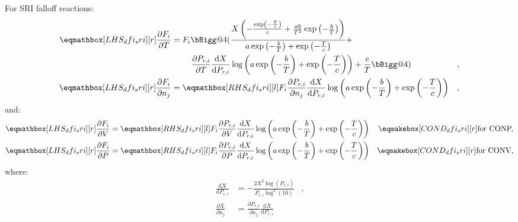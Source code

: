 \documentclass[12pt]{article}
\makeatletter
\newcommand{\conp}{CONP}
\newcommand{\conv}{CONV}
\newcommand{\dconp}{\ifmmode\text{for \conp,}\else for \conp,\fi}
\newcommand{\dconv}{\ifmmode\text{for \conv,}\else for \conv.\fi}
\newcommand{\vast}{\bBigg@{4}}
\makeatother
\begin{document}
For SRI falloff reactions:
\begin{align}
 \lhs{dfi_sri}{\frac{\partial F_{i} }{\partial T }} &= F_{i} \vast(\frac{X \left(- \frac{\operatorname{exp}\left({- \frac{T}{c}}\right)}{c} + \frac{a b}{T^{2}} \operatorname{exp}\left({- \frac{b}{T}}\right)\right)}{a \operatorname{exp}\left({- \frac{b}{T}}\right) + \operatorname{exp}\left({- \frac{T}{c}}\right)} + \nonumber \\
 & \mathindent \frac{\partial P_{r, i} }{\partial T } \frac{\text{d} X }{\text{d} P_{r, i} } \log{\left (a \operatorname{exp}\left({- \frac{b}{T}}\right) + \operatorname{exp}\left({- \frac{T}{c}}\right) \right )}+ \frac{e}{T} \vast) & , \label{e:dfi_sri_dt} \\
 \lhs{dfi_sri}{\frac{\partial F_{i} }{\partial {n_j} }} &= \rhs{dfi_sri}{F_{i} \frac{\partial P_{r, i} }{\partial {n_j} } \frac{\text{d} X }{\text{d} P_{r, i} } \log{\left (a \operatorname{exp}\left({- \frac{b}{T}}\right) + \operatorname{exp}\left({- \frac{T}{c}}\right) \right )}} & , \label{e:dfi_sri_dnj}
\end{align}
and:
\begin{subequations}
 \label{e:dfi_sri_de}
 \begin{align}
 \lhs{dfi_sri}{\frac{\partial F_{i} }{\partial V }} &= \rhs{dfi_sri}{F_{i} \frac{\partial P_{r, i} }{\partial V } \frac{\text{d} X }{\text{d} P_{r, i} } \log{\left (a \operatorname{exp}\left({- \frac{b}{T}}\right) + \operatorname{exp}\left({- \frac{T}{c}}\right) \right )}} & \cond{dfi_sri}{\dconp} \\
 \lhs{dfi_sri}{\frac{\partial F_{i} }{\partial P }} &= \rhs{dfi_sri}{F_{i} \frac{\partial P_{r, i} }{\partial P } \frac{\text{d} X }{\text{d} P_{r, i} } \log{\left (a \operatorname{exp}\left({- \frac{b}{T}}\right) + \operatorname{exp}\left({- \frac{T}{c}}\right) \right )}} & \cond{dfi_sri}{\dconv}
 \end{align}
\end{subequations}
where:
\begin{align}
 \frac{\text{d} X }{\text{d} P_{r, i} } &= - \frac{2 X^{2} \log{\left (P_{r, i} \right )}}{P_{r, i} \log^{2}{\left (10 \right )}} &, \\
 \frac{\partial X}{\partial n_j} &= \frac{\partial P_{r, i} }{\partial {n_j} } \frac{\text{d} X }{\text{d} P_{r, i} }
\end{align}
\end{document}
